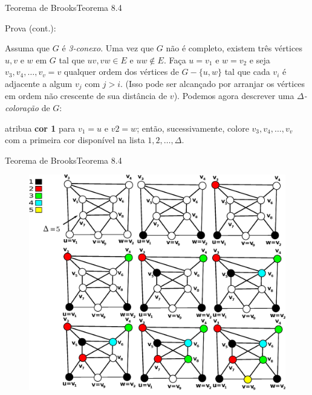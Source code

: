 \documentclass{beamer}
\begin{document}
\begin{frame}{Teorema de Brooks}{Teorema 8.4}

    
    \begin{block}{Prova (cont.):}
        \begin{sloppypar}
            \justifying
            Assuma que $G$ é \textit{3-conexo}. Uma vez que $G$ não é completo, existem três vértices $u,v$ e $w$ em $G$ tal que $uv, vw \in E$ e $uw \notin E$. 
            \vskip 0.3cm
            Faça $u = v_1$ e $w = v_2$ e seja $v_3, v_4, \dots, v_v=v$ qualquer ordem dos vértices de $G-\{u,w\}$ tal que cada $v_i$ é adjacente a algum $v_j$ com $j > i$. (Isso pode ser alcançado por arranjar os vértices em ordem não crescente de sua distância de $v$).
            \vskip 0.3cm
            Podemos agora descrever uma $\Delta$\textit{-coloração } de $G$: 
            \vskip 0.1cm
            
            \begin{outline}
            \1[1.] atribua \textbf{cor 1} para $v_1=u$ e $v2=w$;
            \1[2.] então, sucessivamente, colore $v_3,v_4,\dots,v_v$ com a primeira cor disponível na lista $1,2,\dots,\Delta$.                
            \end{outline}          
            
        \end{sloppypar}
    \end{block}
        
\end{frame}

\begin{frame}{Teorema de Brooks}{Teorema 8.4}

    \begin{figure}
      \includegraphics[scale=0.35]{delta-coloring.eps}           
    \end{figure}
        
\end{frame}
\end{document}
